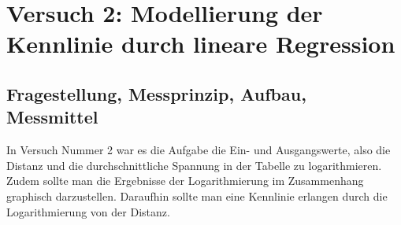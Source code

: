 \documentclass[12pt, oneside, a4paper, \docLanguage]{report}
\begin{document}
%
%
\chapter{Versuch 2: Modellierung der Kennlinie durch lineare Regression}
\label{chap:VERSUCH_2}

\section{Fragestellung, Messprinzip, Aufbau, Messmittel}
\label{chap:VERSUCH_2_FRAGESTELLUNG}
In Versuch Nummer 2 war es die Aufgabe die Ein- und Ausgangswerte, also die Distanz und die durchschnittliche Spannung in der Tabelle zu logarithmieren.
Zudem sollte man die Ergebnisse der Logarithmierung im Zusammenhang graphisch darzustellen.
Daraufhin sollte man eine Kennlinie erlangen durch die Logarithmierung von der Distanz.

\newpage
\end{document}
